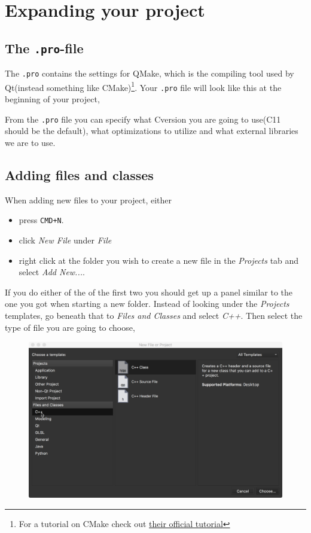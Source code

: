 \documentclass[11pt]{article}
\newcommand{\CC}{C\nolinebreak\hspace{-.05em}\raisebox{.4ex}{\tiny\bf +}\nolinebreak\hspace{-.10em}\raisebox{.4ex}{\tiny\bf +}}
\def\CC{{C\nolinebreak[4]\hspace{-.05em}\raisebox{.4ex}{\tiny\bf ++}}}
\begin{document}
\section{Expanding your project}
\subsection{The \texorpdfstring{\texttt{.pro}}{.pro}-file}
The \texttt{.pro} contains the settings for QMake, which is the compiling tool used by Qt(instead something like CMake)\footnote{For a tutorial on CMake check out \href{https://cmake.org/cmake-tutorial/}{their official tutorial}}. Your \texttt{.pro} file will look like this at the beginning of your project,

From the \texttt{.pro} file you can specify what \CC version you are going to use(\CC11 should be the default), what optimizations to utilize and what external libraries we are to use.

\subsection{Adding files and classes}
When adding new files to your project, either
\begin{itemize}
    \item press \texttt{CMD+N}.
    \item click \textit{New File} under \textit{File}
    \item right click at the folder you wish to create a new file in the \textit{Projects} tab and select \textit{Add New...}.
\end{itemize}
If you do either of the of the first two you should get up a panel similar to the one you got when starting a new folder. Instead of looking under the \textit{Projects} templates, go beneath that to \textit{Files and Classes} and select \textit{C++}. Then select the type of file you are going to choose,
\begin{figure}[H]
    \centering
    \includegraphics[width=\textwidth]{figures/new_files/select_file.png}
\end{figure}
\end{document}
